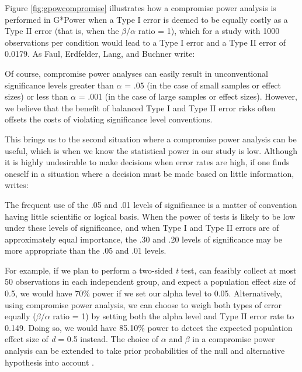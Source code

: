 \documentclass[
  oneside]{krantz}
\renewenvironment{quote}{\begin{VF}}{\end{VF}}
\begin{document}
Figure \ref{fig:gpowcompromise} illustrates how a compromise power analysis is performed in G*Power when a Type I error is deemed to be equally costly as a Type II error (that is, when the \(\beta/\alpha\) ratio = 1), which for a study with 1000 observations per condition would lead to a Type I error and a Type II error of 0.0179. As Faul, Erdfelder, Lang, and Buchner \citeyearpar{faul_gpower_2007} write:

\begin{quote}
Of course, compromise power analyses can easily result in unconventional significance levels greater than \(\alpha\) = .05 (in the case of small samples or effect sizes) or less than \(\alpha\) = .001 (in the case of large samples or effect sizes). However, we believe that the benefit of balanced Type I and Type II error risks often offsets the costs of violating significance level conventions.
\end{quote}

This brings us to the second situation where a compromise power analysis can be useful, which is when we know the statistical power in our study is low. Although it is highly undesirable to make decisions when error rates are high, if one finds oneself in a situation where a decision must be made based on little information, \citet{winer_statistical_1962} writes:

\begin{quote}
The frequent use of the .05 and .01 levels of significance is a matter of convention having little scientific or logical basis. When the power of tests is likely to be low under these levels of significance, and when Type I and Type II errors are of approximately equal importance, the .30 and .20 levels of significance may be more appropriate than the .05 and .01 levels.
\end{quote}

For example, if we plan to perform a two-sided \emph{t} test, can feasibly collect at most 50 observations in each independent group, and expect a population effect size of 0.5, we would have 70\% power if we set our alpha level to 0.05. Alternatively, using compromise power analysis, we can choose to weigh both types of error equally (\(\beta/\alpha\) ratio = 1) by setting both the alpha level and Type II error rate to 0.149. Doing so, we would have 85.10\% power to detect the expected population effect size of \emph{d} = 0.5 instead. The choice of \(\alpha\) and \(\beta\) in a compromise power analysis can be extended to take prior probabilities of the null and alternative hypothesis into account \citep{maier_justify_2022, murphy_statistical_2014, miller_quest_2019}.
\end{document}
